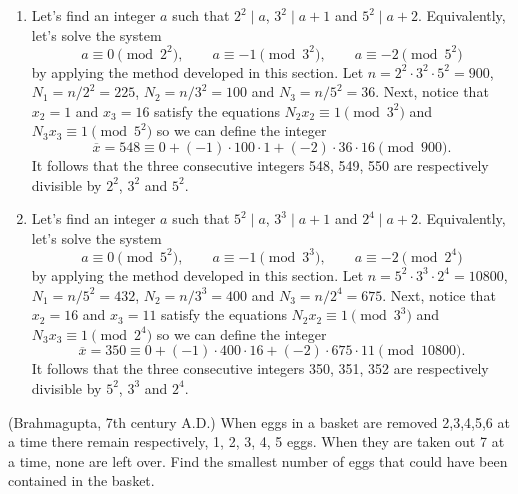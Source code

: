 \begin{solution}
    \begin{enumerate}
        \item Let's find an integer $a$ such that $2^2 \mid a$, $3^2 \mid a+ 1$ and $5^2 \mid a + 2$. Equivalently, let's solve the system
        $$a \equiv 0 \pmod{2^2}, \qquad a \equiv - 1 \pmod{3^2}, \qquad a \equiv - 2 \pmod{5^2}$$
        by applying the method developed in this section. Let $n = 2^2 \cdot 3^2 \cdot 5^2 = 900$, $N_1 = n / 2^2 = 225$, $N_2 = n / 3^2 = 100$ and $N_3 = n / 5^2 = 36$. Next, notice that $x_2 = 1$ and $x_3 = 16$ satisfy the equations $N_2 x_2 \equiv 1 \pmod{3^2}$ and $N_3 x_3 \equiv 1 \pmod{5^2}$ so we can define the integer 
        $$\overline{x} = 548 \equiv 0 + (-1) \cdot 100 \cdot 1 + (-2) \cdot 36 \cdot 16 \pmod{900}.$$
        It follows that the three consecutive integers 548, 549, 550 are respectively divisible by $2^2$, $3^2$ and $5^2$.
        \item Let's find an integer $a$ such that $5^2 \mid a$, $3^3 \mid a+ 1$ and $2^4 \mid a + 2$. Equivalently, let's solve the system
        $$a \equiv 0 \pmod{5^2}, \qquad a \equiv - 1 \pmod{3^3}, \qquad a \equiv - 2 \pmod{2^4}$$
        by applying the method developed in this section. Let $n = 5^2 \cdot 3^3 \cdot 2^4 = 10800$, $N_1 = n / 5^2 = 432$, $N_2 = n / 3^3 = 400$ and $N_3 = n / 2^4 = 675$. Next, notice that $x_2 = 16$ and $x_3 = 11$ satisfy the equations $N_2 x_2 \equiv 1 \pmod{3^3}$ and $N_3 x_3 \equiv 1 \pmod{2^4}$ so we can define the integer 
        $$\overline{x} = 350 \equiv 0 + (-1) \cdot 400 \cdot 16 + (-2) \cdot 675 \cdot 11 \pmod{10800}.$$
        It follows that the three consecutive integers 350, 351, 352 are respectively divisible by $5^2$, $3^3$ and $2^4$. \\
    \end{enumerate}
\end{solution}

\begin{exercise}
    (Brahmagupta, 7th century A.D.) When eggs in a basket are removed 2,3,4,5,6 at a time there remain respectively, 1, 2, 3, 4, 5 eggs. When they are taken out 7 at a time, none are left over. Find the smallest number of eggs that could have been contained in the basket. \\
\end{exercise}

